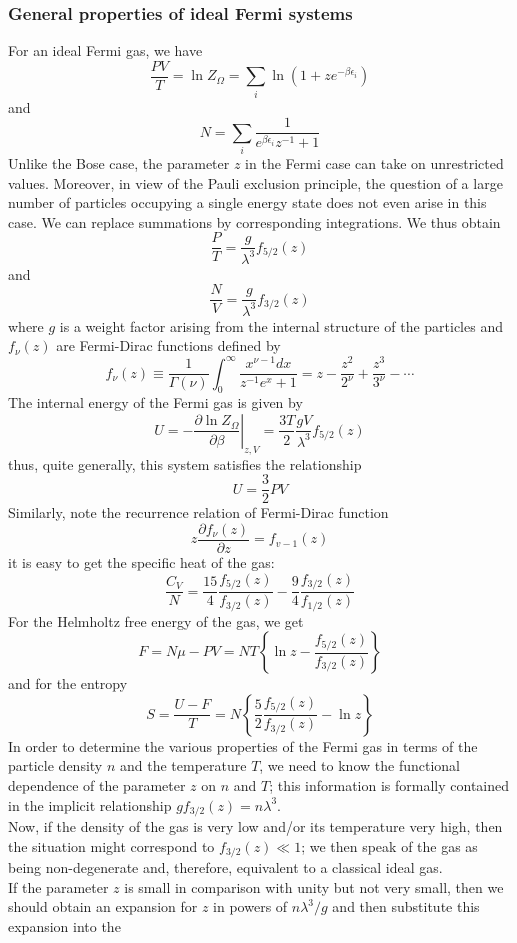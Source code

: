 \subsubsection{General properties of ideal Fermi systems}
For an ideal Fermi gas, we have
\[\frac{PV}{T} = \ln Z_{\Omega} = \sum_i \ln(1+ze^{-\beta\epsilon_i})\]
and
\[N = \sum_i \frac{1}{e^{\beta\epsilon_i}z^{-1} + 1}\]
Unlike the Bose case, the parameter $z$ in the Fermi case can take on unrestricted values. Moreover, in view of the Pauli exclusion principle, the question of a large number of particles occupying a single energy state does not even arise in this case.  We can replace summations by corresponding integrations. We thus obtain
\[\frac{P}{T} = \frac{g}{\lambda^3}f_{5/2}(z)\]
and
\[\frac{N}{V} =  \frac{g}{\lambda^3}f_{3/2}(z)\]
where $g$ is a weight factor arising from the internal structure of the particles and $f_{\nu}(z)$ are Fermi-Dirac functions defined by
\[f_{\nu}(z) \equiv \frac{1}{\Gamma(\nu)} \int_{0}^{\infty} \frac{x^{\nu-1}dx}{z^{-1}e^x + 1} = z - \frac{z^2}{2^{\nu}} + \frac{z^3}{3^{\nu}} - \cdots\]
The internal energy of the Fermi gas is given by
\[U = - \left. \frac{\partial \ln Z_{\Omega}}{\partial \beta} \right|_{z,V} = \frac{3T}{2} \frac{gV}{\lambda^3} f_{5/2}(z)\]
thus, quite generally, this system satisfies the relationship
\[U = \frac{3}{2}PV\]
Similarly, note the recurrence relation of Fermi-Dirac function
\[z\frac{\partial f_{\nu}(z)}{\partial z} = f_{v-1}(z)\]
it is easy to get the specific heat of the gas:
\[\frac{C_V}{N} = \frac{15}{4} \frac{f_{5/2}(z)}{f_{3/2}(z)} -\frac{9}{4} \frac{f_{3/2}(z)}{f_{1/2}(z)}\]
For the Helmholtz free energy of the gas, we get
\[F = N\mu - PV = NT \left\{ \ln z - \frac{f_{5/2}(z)}{f_{3/2}(z)} \right\}\]
and for the entropy
\[S = \frac{U-F}{T} = N \left\{ \frac{5}{2} \frac{f_{5/2}(z)}{f_{3/2}(z)} - \ln z \right\}\]
In order to determine the various properties of the Fermi gas in terms of the particle density $n$ and the temperature $T$, we need to know the functional dependence of the parameter $z$ on $n$ and $T$; this information is formally contained in the implicit relationship $g f_{3/2}(z) = n\lambda^3$. 
\\
Now, if the density of the gas is very low and/or its temperature very high, then the situation might correspond to $f_{3/2}(z) \ll 1$; we then speak of the gas as being non-degenerate and, therefore, equivalent to a classical ideal gas.
\\
If the parameter $z$ is small in comparison with unity but not very small, then we should obtain an expansion for $z$ in powers of $n\lambda^3/g$ and then substitute this expansion into the
